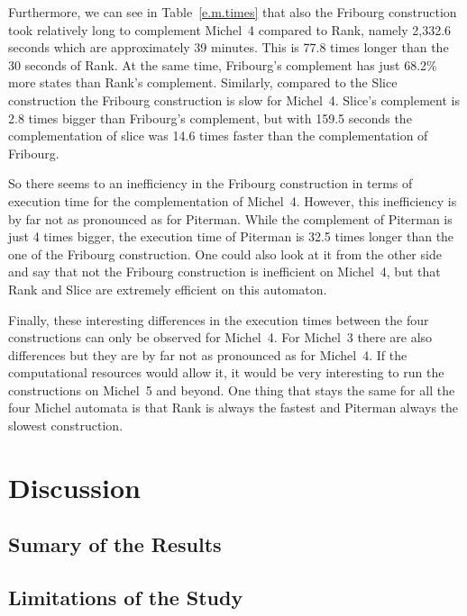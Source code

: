 Furthermore, we can see in Table~\ref{e.m.times} that also the Fribourg construction took relatively long to complement Michel~4 compared to Rank, namely 2,332.6 seconds which are approximately 39 minutes. This is 77.8 times longer than the 30 seconds of Rank. At the same time, Fribourg's complement has just 68.2\% more states than Rank's complement. Similarly, compared to the Slice construction the Fribourg construction is slow for Michel~4. Slice's complement is 2.8 times bigger than Fribourg's complement, but with 159.5 seconds the complementation of slice was 14.6 times faster than the complementation of Fribourg.

So there seems to an inefficiency in the Fribourg construction in terms of execution time for the complementation of Michel~4. However, this inefficiency is by far not as pronounced as for Piterman. While the complement of Piterman is just 4 times bigger, the execution time of Piterman is 32.5 times longer than the one of the Fribourg construction. One could also look at it from the other side and say that not the Fribourg construction is inefficient on Michel~4, but that Rank and Slice are extremely efficient on this automaton.

Finally, these interesting differences in the execution times between the four constructions can only be observed for Michel~4. For Michel~3 there are also differences but they are by far not as pronounced as for Michel~4. If the computational resources would allow it, it would be very interesting to run the constructions on Michel~5 and beyond. One thing that stays the same for all the four Michel automata is that Rank is always the fastest and Piterman always the slowest construction.

\section{Discussion}
\label{5_discussion}

\subsection{Sumary of the Results}
\label{5_summary}

\subsection{Limitations of the Study}
\label{5_limitations}
